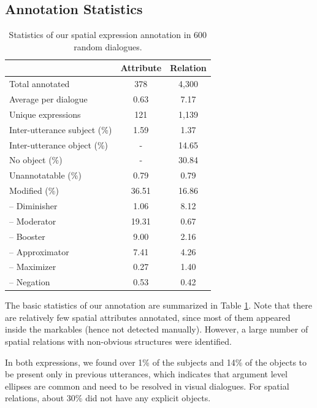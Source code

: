 \subsection{Annotation Statistics}
\label{05_subsec:annotation_statistics}

\begin{table}[th]
\centering \small
\setlength{\tabcolsep}{9pt}
\begin{tabular}{lcc}
\toprule
 & Attribute & Relation \\
 \midrule
Total annotated & 378 & 4,300 \\
Average per dialogue & 0.63 & 7.17 \\
Unique expressions & 121 & 1,139 \\
Inter-utterance subject (\%) & 1.59 & 1.37 \\
Inter-utterance object (\%) & - & 14.65 \\
No object (\%) & - & 30.84 \\
Unannotatable (\%) & 0.79 & 0.79 \\
\midrule
Modified (\%) & 36.51 & 16.86 \\
\phantom{----}-- Diminisher & 1.06 & 8.12 \\
\phantom{----}-- Moderator & 19.31 & 0.67 \\
\phantom{----}-- Booster & 9.00 & 2.16 \\
\phantom{----}-- Approximator & 7.41 & 4.26 \\
\phantom{----}-- Maximizer & 0.27 & 1.40 \\
\phantom{----}-- Negation & 0.53 & 0.42 \\
\bottomrule
\end{tabular}
\caption{
Statistics of our spatial expression annotation in 600 random dialogues.
}
\label{05_tab:annotation_statistics}
\end{table}

The basic statistics of our annotation are summarized in Table \ref{05_tab:annotation_statistics}. Note that there are relatively few spatial attributes annotated, since most of them appeared inside the markables (hence not detected manually). However, a large number of spatial relations with non-obvious structures were identified.

In both expressions, we found over 1\% of the subjects and 14\% of the objects to be present only in previous utterances, which indicates that argument level ellipses are common and need to be resolved in visual dialogues. For spatial relations, about 30\% did not have any explicit objects.

